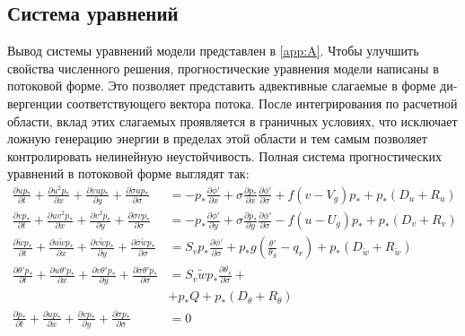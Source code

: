 \documentclass[12pt,a4paper]{report}
\begin{document}
\subsection{Система уравнений}
Вывод системы уравнений модели представлен в \ref{app:A}. Чтобы улучшить свойства численного решения, прогностические уравнения модели написаны в потоковой форме. Это позволяет представить адвективные слагаемые в форме ди-вергенции соответствующего вектора потока. После интегрирования по расчетной области, вклад этих слагаемых проявляется в граничных условиях, что исключает ложную генерацию энергии в пределах этой области и тем самым позволяет контролировать нелинейную неустойчивость. Полная система прогностических уравнений в потоковой форме выглядят так:
\begin{subequations}\label{eq:progn0}
\begin{align}
\frac{\partial{up_*}}{\partial{t}} + \frac{\partial{u^2p_*}}{\partial{x}}+ \frac{\partial{vup_*}}{\partial{y}}+ \frac{\partial{\dot{\sigma}up_*}}{\partial{\sigma}}&=-p_* \frac{\partial{\phi'}}{\partial{x}}+\sigma \frac{\partial{p_*}}{\partial{x}}\frac{\partial{\phi'}}{\partial{\sigma}}+f(v-V_g )p_*+p_*(D_u+R_u )\label{eq:progn1} \\
\frac{\partial{vp_*}}{\partial{t}} + \frac{\partial{uv^2p_*}}{\partial{x}}+ \frac{\partial{v^2p_*}}{\partial{y}}+ \frac{\partial{\dot{\sigma}vp_*}}{\partial{\sigma}}&=-p_* \frac{\partial{\phi'}}{\partial{y}}+\sigma \frac{\partial{p_*}}{\partial{y}}\frac{\partial{\phi'}}{\partial{\sigma}}-f(u-U_g )p_*+p_*(D_v+R_v )\label{eq:progn2} \\
\frac{\partial{\tilde{w}p_*}}{\partial{t}} + \frac{\partial{u\tilde{w}p_*}}{\partial{x}}+ \frac{\partial{v\tilde{w}p_*}}{\partial{y}}+ \frac{\partial{\dot{\sigma}\tilde{w}p_*}}{\partial{\sigma}}&=S_vp_*\frac{\partial{\phi'}}{\partial{\sigma}}+p_*g(\frac{\theta'}{\theta_S}-q_r)+p_*(D_{\tilde{w}}+R_{\tilde{w}})\label{eq:progn3} \\
\frac{\partial{\theta'p_*}}{\partial{t}} + \frac{\partial{u\theta'p_*}}{\partial{x}}+ \frac{\partial{v\theta'p_*}}{\partial{y}}+ \frac{\partial{\dot{\sigma}\theta'p_*}}{\partial{\sigma}}&=S_v\tilde{w}p_* \frac{\partial{\theta_s}}{\partial{\sigma}}+\\&+p_*Q+p_*(D_{\theta}+R_{\theta})\label{eq:progn4} \\
\frac{\partial{p_*}}{\partial{t}} + \frac{\partial{up_*}}{\partial{x}}+ \frac{\partial{vp_*}}{\partial{y}}+ \frac{\partial{\dot{\sigma}p_*}}{\partial{\sigma}}&=0\label{eq:progn5} \\

\end{align}
\end{subequations}
\end{document}
